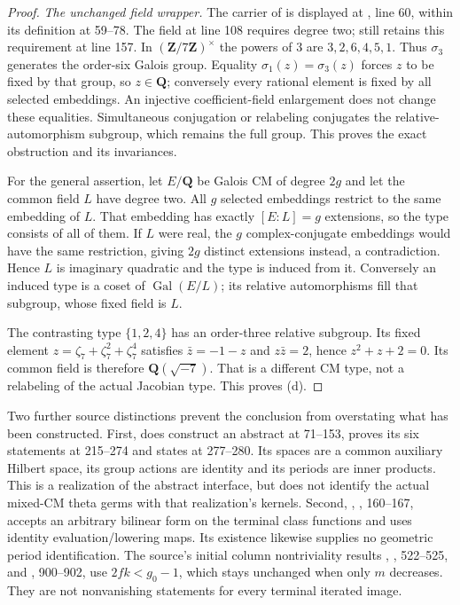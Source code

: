 \begin{proof}
\textit{The unchanged field wrapper.}
The carrier of  is displayed at
, line 60, within its definition
at 59--78. The field  at line 108 requires degree
two;  still retains this requirement at line 157.
In $(\mathbf Z/7\mathbf Z)^\times$ the powers of $3$ are
$3,2,6,4,5,1$. Thus $\sigma_3$ generates the order-six Galois group.
Equality $\sigma_1(z)=\sigma_3(z)$ forces $z$ to be fixed by that group,
so $z\in\mathbf Q$; conversely every rational element is fixed by all
selected embeddings. An injective coefficient-field enlargement does not
change these equalities. Simultaneous conjugation or relabeling conjugates
the relative-automorphism subgroup, which remains the full group.
This proves the exact obstruction and its invariances.

For the general assertion, let $E/\mathbf Q$ be Galois CM of degree $2g$
and let the common field $L$ have degree two.
All $g$ selected embeddings restrict to the same embedding of $L$.
That embedding has exactly $[E:L]=g$ extensions, so the type consists
of all of them.
If $L$ were real, the $g$ complex-conjugate embeddings would have the same
restriction, giving $2g$ distinct extensions instead, a contradiction.
Hence $L$ is imaginary quadratic and the type is induced from it.
Conversely an induced type is a coset of $\operatorname{Gal}(E/L)$;
its relative automorphisms fill that subgroup, whose fixed field is $L$.

The contrasting type $\{1,2,4\}$ has an order-three relative subgroup.
Its fixed element $z=\zeta_7+\zeta_7^2+\zeta_7^4$ satisfies
$\bar z=-1-z$ and $z\bar z=2$, hence $z^2+z+2=0$.
Its common field is therefore $\mathbf Q(\sqrt{-7})$.
That is a different CM type, not a relabeling of the actual Jacobian type.
This proves (d).
\end{proof}

Two further source distinctions prevent the conclusion from overstating
what has been constructed.
First, 
does construct an abstract  at 71--153, proves its six
statements at 215--274 and states  at 277--280.
Its spaces are a common auxiliary Hilbert space, its group actions are
identity and its periods are inner products.
This is a realization of the abstract interface, but does not identify
the actual mixed-CM theta germs with that realization's kernels.
Second, , , 160--167,
accepts an arbitrary bilinear form on the terminal class functions and
uses identity evaluation/lowering maps.
Its existence likewise supplies no geometric period identification.
The source's initial column nontriviality results
, , 522--525, and
, 900--902, use $2fk<g_0-1$,
which stays unchanged when only $m$ decreases.
They are not nonvanishing statements for every terminal iterated image.

